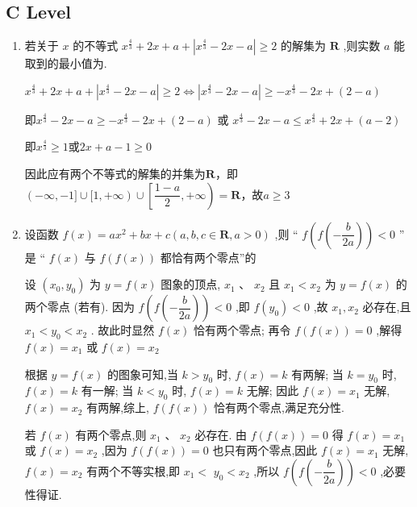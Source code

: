 \subsection*{C Level}
\begin{enumerate}
    \item 若关于 $x$ 的不等式 ${x}^{\frac{4}{3}} + {2x} + a + \left| {{x}^{\frac{4}{3}} - {2x} - a}\right|  \geq  2$ 的解集为 $\mathbf{R}$ ,则实数 $a$ 能取到的最小值为.
    \begin{jieda}
        ${x}^{\frac{4}{3}} + {2x} + a + \left| {{x}^{\frac{4}{3}} - {2x} - a}\right|  \geq  2 \Longleftrightarrow \left| {{x}^{\frac{4}{3}} - {2x} - a}\right| \geq -{x}^{\frac{4}{3}} - {2x} + (2-a)$

        即${x}^{\frac{4}{3}} - {2x} - a \geq -{x}^{\frac{4}{3}} - {2x} + (2-a)$ 或 ${x}^{\frac{4}{3}} - {2x} - a \leq{x}^{\frac{4}{3}} + {2x} + (a-2)$

        即${x}^{\frac{4}{3}} \geq 1$或$2x+a-1 \geq 0$

        因此应有两个不等式的解集的并集为$\mathbf{R}$，即$(-\infty, -1] \cup [1, +\infty) \cup \left[\dfrac{1-a}{2}, +\infty\right) = \mathbf{R}$，故$a \geq  3$
    \end{jieda}

    \item 设函数 $f\left( x\right)  = a{x}^{2} + {bx} + c\left( {a,b,c \in  \mathbf{R},a > 0}\right)$ ,则 “ $f\left( {f\left( {-\dfrac{b}{2a}}\right) }\right)  < 0$ ” 是 “ $f\left( x\right)$ 与 $f\left( {f\left( x\right) }\right)$ 都恰有两个零点”的
    \begin{jieda}
        设 $\left( {{x}_{0},{y}_{0}}\right)$ 为 $y = f\left( x\right)$ 图象的顶点, ${x}_{1}\text{ 、 }{x}_{2}$ 且 ${x}_{1} < {x}_{2}$ 为 $y = f\left( x\right)$ 的两个零点 (若有). 因为 $f\left( {f\left( {-\dfrac{b}{2a}}\right) }\right)  < 0$ ,即 $f\left( {y}_{0}\right)  < 0$ ,故 ${x}_{1},{x}_{2}$ 必存在,且 ${x}_{1} < {y}_{0} < {x}_{2}$ . 故此时显然 $f\left( x\right)$ 恰有两个零点; 再令 $f\left( {f\left( x\right) }\right)  = 0$ ,解得 $f\left( x\right)  = {x}_{1}$ 或 $f\left( x\right)  = {x}_{2}$
        
        根据 $y = f\left( x\right)$ 的图象可知,当 $k > {y}_{0}$ 时, $f\left( x\right)  = k$ 有两解; 当 $k = {y}_{0}$ 时, $f\left( x\right)  = k$ 有一解; 当 $k < {y}_{0}$ 时, $f\left( x\right)  = k$ 无解; 因此 $f\left( x\right)  = {x}_{1}$ 无解, $f\left( x\right)  = {x}_{2}$ 有两解,综上, $f\left( {f\left( x\right) }\right)$ 恰有两个零点,满足充分性. 
        
        若 $f\left( x\right)$ 有两个零点,则 ${x}_{1}\text{ 、 }{x}_{2}$ 必存在. 由 $f\left( {f\left( x\right) }\right)  = 0$ 得 $f\left( x\right)  = {x}_{1}$ 或 $f\left( x\right)  = {x}_{2}$ ,因为 $f\left( {f\left( x\right) }\right)  = 0$ 也只有两个零点,因此 $f\left( x\right)  = {x}_{1}$ 无解, $f\left( x\right)  = {x}_{2}$ 有两个不等实根,即 ${x}_{1} <$  ${y}_{0} < {x}_{2}$ ,所以 $f\left( {f\left( {-\dfrac{b}{2a}}\right) }\right)  < 0$ ,必要性得证.
    \end{jieda}
\end{enumerate}

